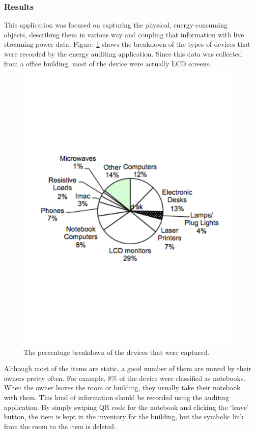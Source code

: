 \subsubsection{Results}
This application was focused on capturing the physical, energy-consuming objects, describing them in various way
and coupling that information with live streaming power data.  Figure~\ref{fig:devicecount} shows the breakdown of the
types of devices that were recorded by the energy auditing application.  Since this data was collected from a office
building, most of the device were actually LCD screens.

\begin{figure}[htb!]
\begin{center}
\includegraphics[scale=0.42]{figs/devicecount}
\caption{The percentage breakdown of the devices that were captured.}
\label{fig:devicecount}
\end{center}
\end{figure}

Although most of the items are static, a good number of them are moved by their owners pretty often.  For example, 8\%
of the device were classified as notebooks.  When the owner leaves the room or building, they usually take their notebook
with them.  This kind of information should be recorded using the auditing application.  By simply swiping QR code for the notebook
and clicking the `leave' button, the item is kept in the inventory for the building, but the symbolic link from the 
room to the item is deleted.

